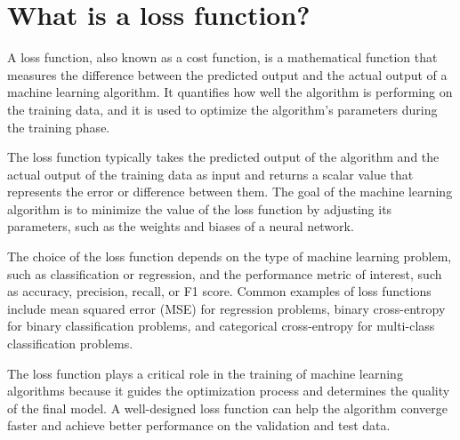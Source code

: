\section{What is a loss function?}
A loss function, also known as a cost function, is a mathematical function that measures the difference between the predicted output and the actual output of a machine learning algorithm. It quantifies how well the algorithm is performing on the training data, and it is used to optimize the algorithm's parameters during the training phase.

The loss function typically takes the predicted output of the algorithm and the actual output of the training data as input and returns a scalar value that represents the error or difference between them. The goal of the machine learning algorithm is to minimize the value of the loss function by adjusting its parameters, such as the weights and biases of a neural network.

The choice of the loss function depends on the type of machine learning problem, such as classification or regression, and the performance metric of interest, such as accuracy, precision, recall, or F1 score. Common examples of loss functions include mean squared error (MSE) for regression problems, binary cross-entropy for binary classification problems, and categorical cross-entropy for multi-class classification problems.

The loss function plays a critical role in the training of machine learning algorithms because it guides the optimization process and determines the quality of the final model. A well-designed loss function can help the algorithm converge faster and achieve better performance on the validation and test data.

